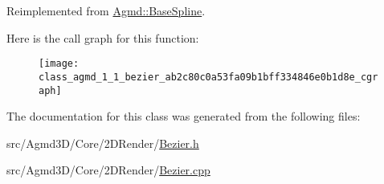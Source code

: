 Reimplemented from \hyperlink{class_agmd_1_1_base_spline_a589f90c641d154374b477152de1ac7a7}{Agmd\+::\+Base\+Spline}.



Here is the call graph for this function\+:\nopagebreak
\begin{figure}[H]
\begin{center}
\leavevmode
\texttt{[image: class\_agmd\_1\_1\_bezier\_ab2c80c0a53fa09b1bff334846e0b1d8e\_cgraph]}
\end{center}
\end{figure}




The documentation for this class was generated from the following files\+:\begin{DoxyCompactItemize}
\item 
src/\+Agmd3\+D/\+Core/2\+D\+Render/\hyperlink{_bezier_8h}{Bezier.\+h}\item 
src/\+Agmd3\+D/\+Core/2\+D\+Render/\hyperlink{_bezier_8cpp}{Bezier.\+cpp}\end{DoxyCompactItemize}
